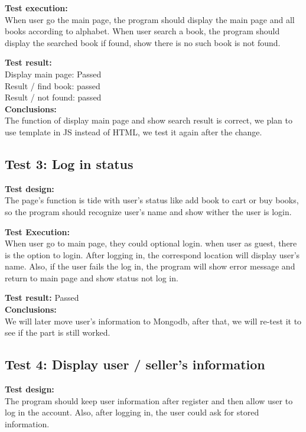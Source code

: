 \documentclass[12pt]{article}
\begin{document}
	\textbf{Test execution:} \\
	When user go the main page, the program should display the main page and all books according to alphabet. When user search a book, the program should display the searched book if found, show there is no such book is not found.

	\textbf{Test result: }\\
			Display main page: Passed \\
          	Result / find book: passed \\
          	Result / not found: passed \\

	\textbf{Conclusions:} \\
	The function of display main page and show search result is correct, we plan to use template in JS instead of HTML, we test it again after the change.


	\subsection{Test 3: Log in status}

	\textbf{Test design:} \\
	The page’s function is tide with user’s status like add book to cart or buy books, so the program should recognize user’s name and show wither the user is login.

	\textbf{Test Execution: } \\
	When user go to main page, they could optional login. when user as guest, there is the option to login. After logging in, the correspond location will display user’s name. Also, if the user fails the log in, the program will show error message and return to main page and show status not log in.

	\textbf{Test result: } Passed \\

	\textbf{Conclusions:} \\
	We will later move user’s information to Mongodb, after that, we will re-test it to see if the part is still worked.


	\subsection{Test 4: Display user / seller's information}

	\textbf{Test design:} \\
	The program should keep user information after register and then allow user to log in the account. Also, after logging in, the user could ask for stored information.
\end{document}
